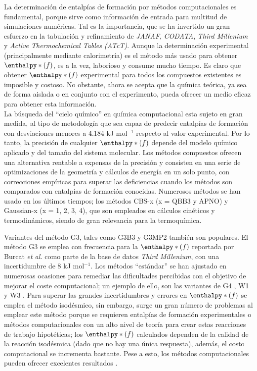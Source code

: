 La determinación de entalpías de formación por métodos computacionales es fundamental, porque sirve como información de entrada para multitud de simulaciones numéricas. Tal es la importancia, que se ha invertido un gran esfuerzo en la tabulación y refinamiento de \textit{JANAF}\cite{NIST1998}, \textit{CODATA}\cite{Cox1989}, \textit{Third Millenium}\cite{Goos1998} y \textit{Active Thermochemical Tables (ATcT)}\cite{Ruscic2004, Ruscic2005, Ruscic2005b}. Aunque la determinación experimental (principalmente mediante calorimetría) es el método más usado para obtener $\enthalpy*(f){}$, es a la vez, laborioso y consume mucho tiempo. Es claro que obtener $\enthalpy*(f){}$ experimental para todos los compuestos existentes es imposible y costoso. No obstante, ahora se acepta que la química teórica, ya sea de forma aislada o en conjunto con el experimento, pueda ofrecer un medio eficaz para obtener esta información.\\

La búsqueda del ``cielo químico'' en química computacional esta sujeto en gran medida, al tipo de metodología que sea capaz de predecir entalpías de formación con desviaciones menores a 4.184 kJ mol$^{-1}$ respecto al valor experimental. Por lo tanto, la precisión de cualquier $\enthalpy*(f){}$ depende del modelo químico aplicado y del tamaño del sistema molecular. Los métodos compuestos ofrecen una alternativa rentable a expensas de la precisión y consisten en una serie de optimizaciones de la geometría y cálculos de energía en un solo punto, con correcciones empíricas para superar las deficiencias cuando los métodos son comparados con entalpías de formación conocidas. Numerosos métodos se han usado en los últimos tiempos; los métodos CBS-x \cite{Montgomery2000, Ochterski1996} (x = QBB3 y APNO) y Gaussian-x \cite{Pople1989,Curtiss1990, Curtiss1991, Curtiss1998, Curtiss2007} (x = 1, 2, 3, 4), que son empleados en cálculos cinéticos y termodinámicos, siendo de gran relevancia para la termoquímica. 

Variantes del método G3, tales como G3B3 \cite{Baboul1999} y G3MP2 \cite{Curtiss1999} también son populares. El método G3 se emplea con frecuencia para la $\enthalpy*(f){}$ reportada por Burcat \textit{et al.} como parte de la base de datos \textit{Third Millenium}, con una incertidumbre de 8 kJ mol$^{-1}$. Los métodos ``estándar'' se han ajustado en numerosas ocasiones para remediar las dificultades percibidas con el objetivo de mejorar el coste computacional; un ejemplo de ello, son las variantes  de G4 \cite{Chan2010, Chan2011}, W1 \cite{Chan2012, Karton2012} y W3 \cite{Chan2013, Gruzman2009}. Para superar las grandes incertidumbres y errores en $\enthalpy*(f){}$ se emplea el método isodésmico, sin embargo, surge  un gran número de problemas al emplear este método porque se requieren entalpías de formación experimentales o métodos computacionales con un alto nivel de teoría para crear estas reacciones de trabajo hipotéticas;  los $\enthalpy*(f){}$ calculados dependen de la calidad de la reacción isodésmica (dado que no hay una única respuesta), además, el costo computacional se incrementa bastante. Pese a esto, los métodos computacionales pueden ofrecer excelentes resultados \cite{Simmie2015}.

